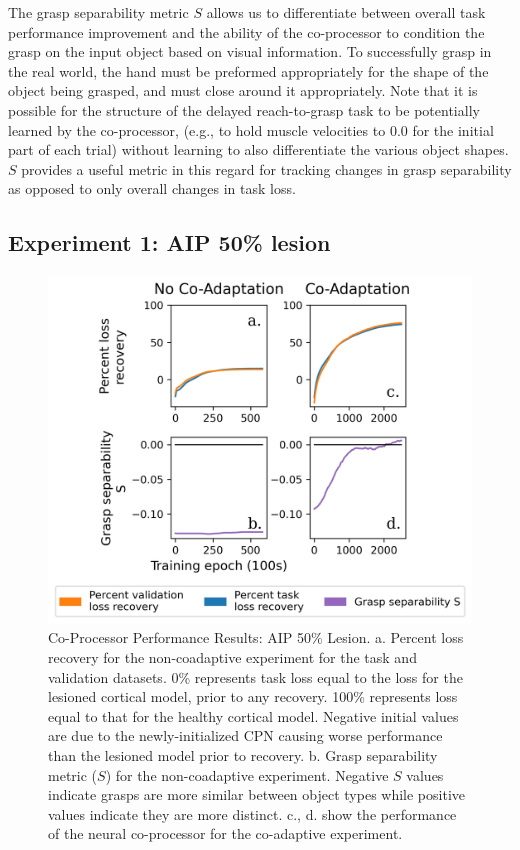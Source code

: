 \documentclass[12pt]{iopart}
\begin{document}
The grasp separability metric $S$ allows us to differentiate between overall task performance improvement
and the ability of the co-processor to condition the grasp on the input object based on visual information.
To successfully grasp in the real world, the hand must be preformed appropriately for
the shape of the object being grasped, and must close around it appropriately.
Note that it is possible for the structure of the delayed reach-to-grasp task to be potentially learned
by the co-processor, (e.g., to hold muscle velocities to 0.0 for the initial part of each trial) without
learning to also differentiate the various object shapes. $S$ provides a useful metric in this regard for
tracking changes in grasp separability as opposed to only overall changes in task loss.

\subsection{Experiment 1: AIP 50\% lesion}
\begin{figure}[h]
\centering
\includegraphics[scale=1]{training_results_aip.png}
\caption{Co-Processor Performance Results: AIP 50\% Lesion. a. Percent loss recovery for the non-coadaptive
         experiment for the task and validation datasets. 0\% represents task loss equal to the loss for the
         lesioned cortical model, prior to any recovery. 100\% represents loss equal to that for the healthy
         cortical model. Negative initial values are due to the newly-initialized CPN causing
         worse performance than the lesioned model prior to recovery. b. Grasp separability metric ($S$) for the non-coadaptive
         experiment. Negative $S$ values indicate grasps are more similar between object types while 
         positive values indicate they are more distinct. c., d. show the performance of the neural co-processor for the
         co-adaptive experiment.}
\label{fig:results_aip}
\end{figure}
\end{document}
